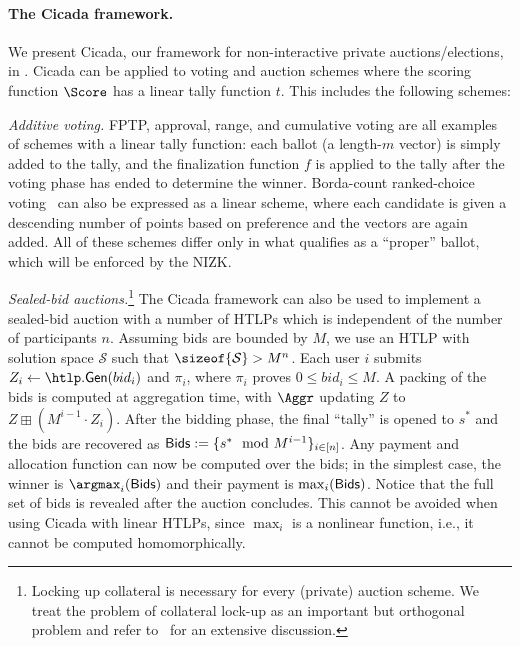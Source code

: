 
\paragraph{The Cicada framework.}
We present Cicada, our framework for non-interactive private auctions/elections, in . Cicada can be applied to voting and auction schemes where the scoring function $\Score$ has a linear tally function $t$. 
This includes the following schemes:

\textit{Additive voting.}
FPTP, approval, range, and cumulative voting are all examples of schemes with a linear tally function: each ballot (a length-$m$ vector) is simply added to the tally, and the finalization function $f$ is applied to the tally after the voting phase has ended to determine the winner. Borda-count ranked-choice voting~\cite{Emerson13} can also be expressed as a linear scheme, where each candidate is given a descending number of points based on preference and the vectors are again added. All of these schemes differ only in what qualifies as a ``proper'' ballot, which will be enforced by the NIZK.

\textit{Sealed-bid auctions.}\footnote{Locking up collateral is necessary for every (private) auction scheme. We treat the problem of collateral lock-up as an important but orthogonal problem and refer to~\cite{CCS:TAFWBM23} for an extensive discussion.}
The Cicada framework can also be used to implement a sealed-bid auction with a number of HTLPs which is independent of the number of participants $n$. 
Assuming bids are bounded by $M$, we use an HTLP with solution space $\mathcal{S}$ such that $\sizeof{\mathcal{S}} > M^n$.
Each user $i$ submits $Z_i \gets \htlp.{\sf Gen}({bid}_i)$ and $\pi_i$, where $\pi_i$ proves $0 \leq {bid}_i \leq M$. A packing of the bids is computed at aggregation time, with $\Aggr$ updating $Z$ to $Z \boxplus (M^{i-1} \cdot Z_i)$. After the bidding phase, the final ``tally'' is opened to $s^*$ and the bids are recovered as ${\sf Bids} := \{ s^* \mod{M^{i-1}} \}_{i \in [n]}$. Any payment and allocation function can now be computed over the bids; in the simplest case, the winner is $\argmax_i ({\sf Bids})$ and their payment is $\max_i ({\sf Bids})$. Notice that the full set of bids is revealed after the auction concludes. This cannot be avoided when using Cicada with linear HTLPs, since $\max_i$ is a nonlinear function, i.e., it cannot be computed homomorphically.

